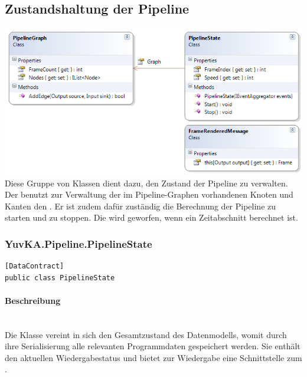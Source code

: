 \subsection{Zustandshaltung der Pipeline}

\includegraphics[width=\textwidth]{YuvKA.Pipeline/states.png}
Diese Gruppe von Klassen dient dazu, den Zustand der Pipeline zu verwalten. Der  benutzt zur Verwaltung der im Pipeline-Graphen vorhandenen Knoten und Kanten den . Er ist zudem dafür zuständig die Berechnung der Pipeline zu starten und zu stoppen. Die  wird geworfen, wenn ein Zeitabschnitt berechnet ist.

\subsubsection{YuvKA.Pipeline.PipelineState}

\begin{verbatim}
[DataContract]
public class PipelineState
\end{verbatim}

\paragraph{Beschreibung}~\\
Die Klasse  vereint in sich den Gesamtzustand des Datenmodells, womit durch ihre Serialisierung alle relevanten Programmdaten gespeichert werden. Sie enthält den aktuellen Wiedergabestatus und bietet zur Wiedergabe eine Schnittstelle zum .

